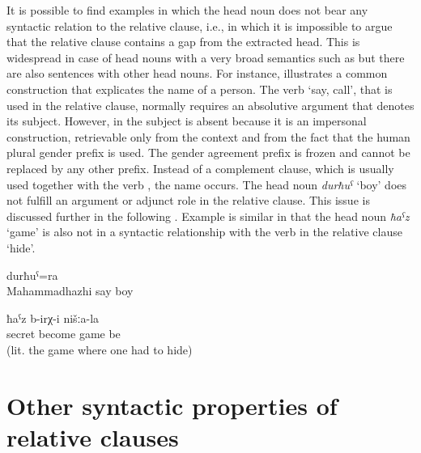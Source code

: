 It is possible to find examples in which the head noun does not bear any syntactic relation to the relative clause, i.e., in which it is impossible to argue that the relative clause contains a gap from the extracted head. This is widespread in case of head nouns with a very broad semantics such as   but there are also sentences with other head nouns. For instance,  illustrates a common construction that explicates the name of a person. The verb  `say, call', that is used in the relative clause, normally requires an absolutive argument that denotes its subject. However, in  the subject is absent because it is an impersonal construction, retrievable only from the context and from the fact that the human plural gender prefix is used. The gender agreement prefix is frozen and cannot be replaced by any other prefix. Instead of a complement clause, which is usually used together with the verb  , the name  occurs. The head noun \textit{durħuˁ} `boy' does not fulfill an argument or adjunct role in the relative clause. This issue is discussed further in the following . Example  is similar in that the head noun \textit{ħaˁz} `game' is also not in a syntactic relationship with the verb in the relative clause `hide'.
%
\begin{exe}
	\ex	\label{ex:the boy called Mahammadhazhi}
	\gll	[Maħaˁmmadħaˁži	b-ik'ʷ-an]	durħuˁ=ra\\
		Mahammadhazhi	say	boy\\
	\glt	{}

	\ex	\label{ex:There was this game of ours, the hide-and-seek}
		ħaˁz	b-irχ-i	nišːa-la\\
		secret	become	game	be	\\
	\glt	{} (lit. the game where one had to hide)
\end{exe}



\section{Other syntactic properties of relative clauses}
\label{sec:Other syntactic properties of relative clauses}

